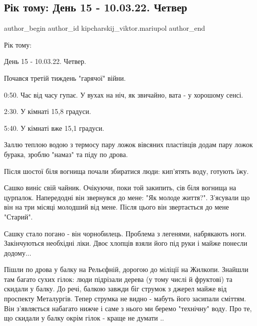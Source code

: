  
 
 
 
 

\subsection{Рік тому:  День 15 - 10.03.22. Четвер}
\label{sec:10_03_2023.fb.kipcharskij_viktor.mariupol.1.r_k_tomu___den_15___}

\ifcmt
 author_begin
   author_id kipcharskij_viktor.mariupol
 author_end
\fi

Рік тому: 

День 15 - 10.03.22. Четвер. 

Почався третій тиждень "гарячої" війни.

0:50. Час від часу гупає. У вухах на ніч,  як звичайно, вата - у хорошому
сенсі. 

2:30. У кімнаті 15,8 градуси.

5:40. У кімнаті вже 15,1 градуси.

Заллю теплою водою з термосу пару ложок вівсяних пластівців додам пару ложок
бурака, зроблю "намаз" та піду по дрова.

Після шостої біля вогнища почали збиратися люди: кип'ятять воду, готують їжу.

Сашко виніс свій чайник. Очікуючи, поки той закипить, сів біля вогнища на
цурпалок. Напередодні він звернувся до мене: "Як молоде життя?". З'ясували що
він на три місяці молодший від мене. Після цього він звертається до мене
"Старий". 

Сашку стало погано - він чорнобилець. Проблема з легенями, набрякають ноги.
Закінчуються необхідні ліки.  Двоє хлопців взяли його під руки і майже понесли
додому...

Пішли по дрова у балку на Рельєфній, дорогою до міліції на Жилкопи. Знайшли там
багато сухих гілок: люди підрізали дерева (у тому числі й фруктові) та скидали
у балку. До речі, балкою завжди біг струмок з джерел майже від проспекту
Металургів. Тепер струмка не видно - мабуть його засипали сміттям. Він
з'являється набагато нижче і саме з нього ми беремо "технічну" воду. Про те, що
скидали у балку окрім гілок - краще не думати ..

